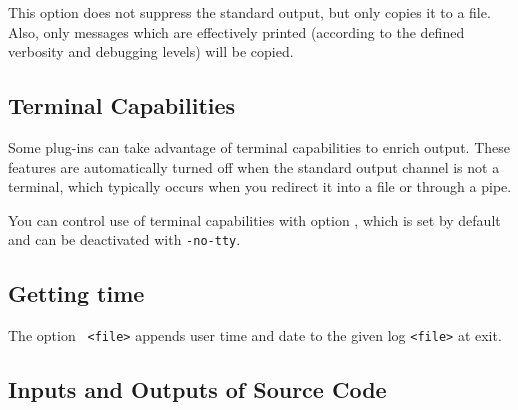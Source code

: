 This option does not suppress the standard \FramaC output, but
only copies it to a file. Also, only messages which are effectively printed
(according to the defined verbosity and debugging levels) will be copied.

\subsection{Terminal Capabilities}

Some plug-ins can take advantage of terminal capabilities to enrich
output.  These features are automatically turned off when the \FramaC
standard output channel is not a terminal, which typically occurs when you
redirect it into a file or through a pipe.

You can control use of terminal capabilities with option
, which is set by default and can be deactivated
with \texttt{-no-tty}.

\subsection{Getting time}

The option \texttt{ <file>} appends user time and date to
the given log \texttt{<file>} at exit.

\subsection{Inputs and Outputs of Source Code}\label{sec:io}

